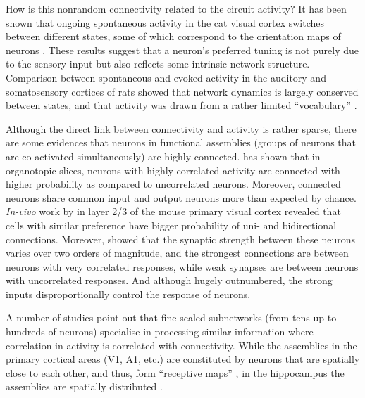     How is this nonrandom connectivity related to the circuit activity? It has
    been shown that ongoing spontaneous activity in the cat visual cortex
    switches between different states, some of which correspond to the
    orientation maps of neurons \citep{Kenet2003}. These results suggest that
    a neuron's preferred tuning is not purely due to the sensory input but also
    reflects some intrinsic network structure. Comparison between spontaneous
    and evoked activity in the auditory and somatosensory cortices of rats
    showed that network dynamics is largely conserved between states, and that
    activity was drawn from a rather limited ``vocabulary'' \citep{Luczak2009,
    Luczak2012}.
    
    Although the direct link between connectivity and activity is rather
    sparse, there are some evidences that neurons in functional assemblies
    (groups of neurons that are co-activated simultaneously) are highly
    connected. \cite{Takahashi2010} has shown that in organotopic slices,
    neurons with highly correlated activity are connected with higher
    probability as compared to uncorrelated neurons. Moreover, connected neurons share
    common input and output neurons more than expected by chance. {\it In-vivo}
    work by \cite{Ko2011} in layer 2/3 of the mouse primary visual cortex
    revealed that cells with similar preference have bigger probability of
    uni- and bidirectional connections. Moreover, \cite{Cossell2015} showed
    that the synaptic strength between these neurons varies over two orders of
    magnitude, and the strongest connections are between neurons with very
    correlated responses, while weak synapses are between neurons with
    uncorrelated responses. And although hugely outnumbered, the strong inputs
    disproportionally control the response of neurons. 

    A number of studies point out that fine-scaled subnetworks (from tens up
    to hundreds of neurons) specialise in processing similar information where
    correlation in activity is correlated with connectivity. While the
    assemblies in the primary cortical areas (V1, A1, etc.) are constituted by
    neurons that are spatially close to each other, and thus, form ``receptive
    maps'' \cite[e.g.,][]{Bathellier2012, Cossell2015}, in the hippocampus the
    assemblies are spatially distributed \citep{Guzman2016}.

